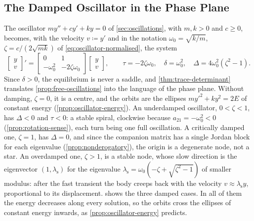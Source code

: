 \subsection{The Damped Oscillator in the Phase Plane}

The oscillator $my''+cy'+ky=0$ of \cref{sec:oscillations}, with $m,k>0$ and $c\ge0$, becomes, with the velocity $v\coloneqq y'$ and in the notation $\omega_0=\sqrt{k/m}$, $\zeta=c/(2\sqrt{mk})$ of \eqref{eq:oscillator-normalised}, the system
\[
\begin{bmatrix}y\\v\end{bmatrix}'=\begin{bmatrix}0&1\\-\omega_0^2&-2\zeta\omega_0\end{bmatrix}\begin{bmatrix}y\\v\end{bmatrix},\qquad\tau=-2\zeta\omega_0,\quad\delta=\omega_0^2,\quad\Delta=4\omega_0^2(\zeta^2-1).
\]
Since $\delta>0$, the equilibrium is never a saddle, and \cref{thm:trace-determinant} translates \cref{prop:free-oscillations} into the language of the phase plane. Without damping, $\zeta=0$, it is a centre, and the orbits are the ellipses $my'^2+ky^2=2E$ of constant energy (\cref{prop:oscillator-energy}). An underdamped oscillator, $0<\zeta<1$, has $\Delta<0$ and $\tau<0$: a stable spiral, clockwise because $a_{21}=-\omega_0^2<0$ (\cref{prop:rotation-sense}), each turn being one full oscillation. A critically damped one, $\zeta=1$, has $\Delta=0$, and since the companion matrix has a single Jordan block for each eigenvalue (\cref{prop:nonderogatory}), the origin is a degenerate node, not a star. An overdamped one, $\zeta>1$, is a stable node, whose slow direction is the eigenvector $(1,\lambda_{\mathrm s})$ for the eigenvalue $\lambda_{\mathrm s}=\omega_0(-\zeta+\sqrt{\zeta^2-1})$ of smaller modulus: after the fast transient the body creeps back with the velocity $v\approx\lambda_{\mathrm s}y$, proportional to its displacement.  shows the three damped cases. In all of them the energy decreases along every solution, so the orbits cross the ellipses of constant energy inwards, as \cref{prop:oscillator-energy} predicts.

